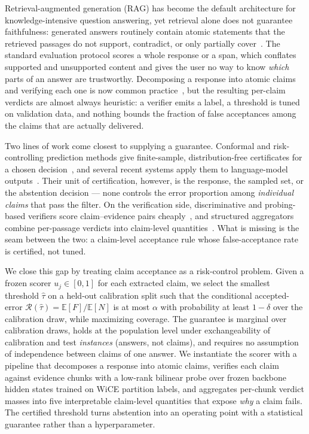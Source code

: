 \documentclass{article}
\begin{document}
Retrieval-augmented generation (RAG) has become the default architecture
for knowledge-intensive question answering, yet retrieval alone does not
guarantee faithfulness: generated answers routinely contain atomic
statements that the retrieved passages do not support, contradict, or
only partially cover~\cite{min2023factscore,niu2024ragtruth}. The
standard evaluation protocol scores a whole response or a span, which
conflates supported and unsupported content and gives the user no way
to know \emph{which} parts of an answer are trustworthy. Decomposing a
response into atomic claims and verifying each one is now common
practice~\cite{min2023factscore,wei2024longfact,akbar2024hallumeasure},
but the resulting per-claim verdicts are almost always heuristic: a
verifier emits a label, a threshold is tuned on validation data, and
nothing bounds the fraction of false acceptances among the claims that
are actually delivered.

Two lines of work come closest to supplying a guarantee. Conformal and
risk-controlling prediction methods give finite-sample, distribution-free
certificates for a chosen decision~\cite{vovk2005algorithmic,bates2021rcps,
angelopoulos2021ltt,angelopoulos2024crc}, and several recent systems apply
them to language-model outputs~\cite{mohri2024conformal,
abbasiyadkori2024conformalabstention,oehri2025unicr,quach2024clm}. Their
unit of certification, however, is the response, the sampled set, or the
abstention decision --- none controls the error proportion among
\emph{individual claims} that pass the filter. On the verification side,
discriminative and probing-based verifiers score claim--evidence pairs
cheaply~\cite{zha2023alignscore,laban2022summac,tang2024minicheck,
azaria2023internal}, and structured aggregators combine per-passage
verdicts into claim-level quantities~\cite{zhou2019gear,liu2020kgat,
wang2026freeguard}. What is missing is the seam between the two: a
claim-level acceptance rule whose false-acceptance rate is certified,
not tuned.

We close this gap by treating claim acceptance as a risk-control
problem. Given a frozen scorer $u_j\in[0,1]$ for each extracted claim,
we select the smallest threshold $\hat\tau$ on a held-out calibration
split such that the conditional accepted-error
$\mathcal{R}(\hat\tau)=\mathbb{E}[F]/\mathbb{E}[N]$ is at most $\alpha$
with probability at least $1-\delta$ over the calibration draw, while
maximizing coverage. The guarantee is marginal over calibration draws,
holds at the population level under exchangeability of calibration and
test \emph{instances} (answers, not claims), and requires no assumption
of independence between claims of one answer. We instantiate the scorer
with a pipeline that decomposes a response into atomic claims, verifies
each claim against evidence chunks with a low-rank bilinear probe over
frozen backbone hidden states trained on WiCE partition labels, and
aggregates per-chunk verdict masses into five interpretable
claim-level quantities that expose \emph{why} a claim fails. The
certified threshold turns abstention into an operating point with a
statistical guarantee rather than a hyperparameter.
\end{document}
